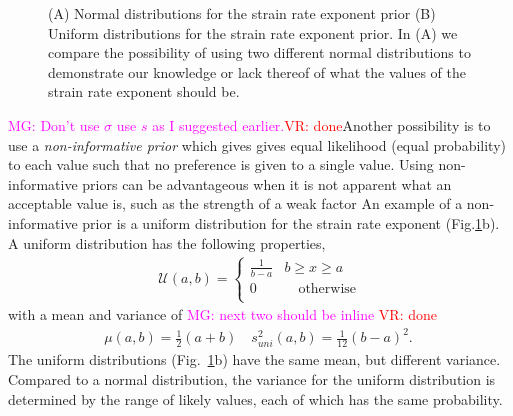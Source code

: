 \documentclass[12pt]{article}
\newcommand{\mgnote}[1]{\textcolor{magenta}{MG: #1}}
\newcommand{\vrnote}[1]{\textcolor{red}{VR: #1}}
\begin{document}
{\begin{figure}[H]
{}

\caption{(A) Normal distributions for the strain rate exponent prior (B) Uniform distributions for the strain rate exponent prior. In (A) we compare the possibility of using two different normal distributions to demonstrate our knowledge or lack thereof of what the values of the strain rate exponent should be. }
\label{fig:prior_ex} 
\end{figure}

\mgnote{Don't use $\sigma$ use $s$ as I suggested earlier.}\vrnote{done}Another possibility is to use a \textit{non-informative prior} \citep{Tarantola05} which gives gives equal likelihood (equal probability) to each value such that no preference is given to a single value. Using non-informative priors can be advantageous when it is not apparent what an acceptable value is, such as the strength of a weak factor An example of a non-informative prior is a uniform distribution for the strain rate exponent (Fig.\ref{fig:prior_ex}b). A uniform distribution has the following properties,
 \begin{align}
\mathcal{U}(a,b) =
\begin{cases}
 \frac{1}{b-a}   &b\geq x \geq a \\
               0 &\quad \text{otherwise} \\
\end{cases}
\end{align}
with a mean and variance of \mgnote{next two should be inline} \vrnote{done}
\begin{align}
\mu(a,b) =\frac{1}{2}(a+b) \quad s_{uni}^2(a,b) =\frac{1}{12}(b-a)^2 .\
\end{align}
The uniform distributions (Fig.~\ref{fig:prior_ex}b) have the same mean, but different variance. Compared to a normal distribution, the variance for the uniform distribution is determined by the range of likely values, each of which has the same probability.
	
}
\end{document}
